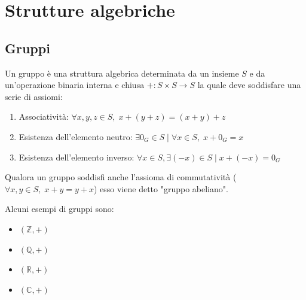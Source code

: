 \documentclass{article}
\begin{document}
\setlength{\parindent}{0pt}

\section{Strutture algebriche}

\subsection{Gruppi}
    Un gruppo è una struttura algebrica determinata da un insieme $S$ e da un'operazione binaria interna e chiusa $+ : S \times S \rightarrow S$ la quale deve soddisfare una serie 
    di assiomi:
    \begin{enumerate}[label=(\arabic*)]
        \item Associatività: $\forall x, y, z \in S, \; x + (y + z) = (x + y) + z$   
        \item Esistenza dell'elemento neutro: $\exists 0_G \in S \; | \; \forall x \in S, \; x + 0_G = x$
        \item Esistenza dell'elemento inverso: $\forall x \in S, \exists (-x) \in S \; | \; x + (-x) = 0_G$
    \end{enumerate}
    Qualora un gruppo soddisfi anche l'assioma di commutatività ($\forall x, y \in S, \; x + y = y + x$) esso viene detto "gruppo abeliano".

    \vspace{10pt}
    Alcuni esempi di gruppi sono:
    \begin{itemize}
        \item $(\mathbb{Z}, +)$
        \item $(\mathbb{Q}, +)$
        \item $(\mathbb{R}, +)$
        \item $(\mathbb{C}, +)$
    \end{itemize}
\end{document}
